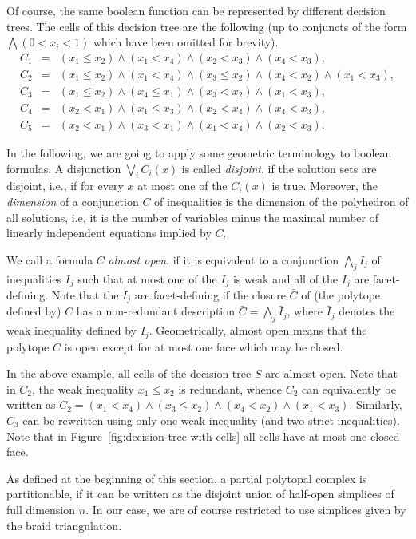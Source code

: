 \documentclass[12pt,reqno]{amsart}
\numberwithin{definition}{section}
\theoremstyle{definition}
\begin{document}
Of course, the same boolean function can be represented by different decision trees. The cells of this decision tree are the following (up to conjuncts of the form $\bigwedge (0 < x_i <1)$ which have been omitted for brevity).
\begin{align*}
C_1 &=& (x_1\leq x_2) \wedge (x_1 < x_4) \wedge (x_2 < x_3) \wedge (x_4 < x_3), \\
C_2 &=& (x_1\leq x_2) \wedge (x_1 < x_4) \wedge (x_3 \leq x_2) \wedge (x_4 < x_2) \wedge (x_1 < x_3), \\
C_3 &=& (x_1\leq x_2) \wedge (x_4 \leq x_1) \wedge (x_3 < x_2) \wedge (x_1 < x_3), \\
C_4 &=& (x_2 < x_1) \wedge (x_1 \leq x_3) \wedge (x_2 < x_4) \wedge (x_4 < x_3), \\
C_5 &=& (x_2 < x_1) \wedge (x_3 < x_1) \wedge (x_1 < x_4) \wedge (x_2 < x_3).
\end{align*}

In the following, we are going to apply some geometric terminology to boolean formulas. A disjunction $\bigvee_i C_i(x)$ is called \emph{disjoint}, if the solution sets are disjoint, i.e., if for every $x$ at most one of the $C_i(x)$ is true. Moreover, the \emph{dimension} of a conjunction $C$ of inequalities is the dimension of the polyhedron of all solutions, i.e, it is the number of variables minus the maximal number of linearly independent equations implied by $C$.

We call a formula $C$ \emph{almost open}, if it is equivalent to a conjunction $\bigwedge_j I_{j}$ of inequalities $I_j$ such that at most one of the $I_j$ is weak and all of the $I_j$ are facet-defining. Note that the $I_j$ are facet-defining if the closure $\bar{C}$ of (the polytope defined by) $C$ has a non-redundant description $\bar{C} = \bigwedge_j \bar{I}_j$, where $\bar{I}_j$ denotes the weak inequality defined by $I_j$. Geometrically, almost open means that the polytope $C$ is open except for at most one face which may be closed.

In the above example, all cells of the decision tree $S$ are almost open. Note that in $C_2$, the weak inequality $x_1 \leq x_2$ is redundant, whence $C_2$ can equivalently be written as $C_2 = (x_1 < x_4) \wedge (x_3 \leq x_2) \wedge (x_4 < x_2) \wedge (x_1 < x_3)$. Similarly, $C_3$ can be rewritten using only one weak inequality (and two strict inequalities). Note that in Figure~\ref{fig:decision-tree-with-cells} all cells have at most one closed face.

As defined at the beginning of this section, a partial polytopal complex is partitionable, if it can be written as the disjoint union of half-open simplices of full dimension $n$. In our case, we are of course restricted to use simplices given by the braid triangulation.
\end{document}
